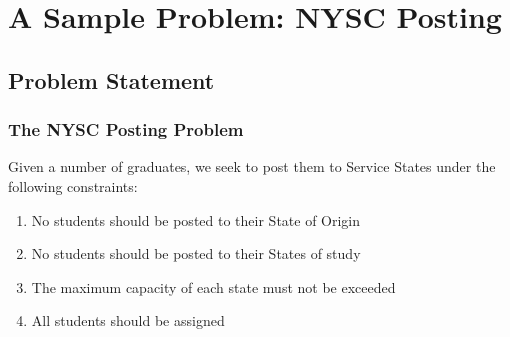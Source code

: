 \documentclass[10pt]{beamer}
\begin{document}
	\section{A Sample Problem: NYSC Posting}
		\subsection{Problem Statement}
			\begin{frame}
				\frametitle{The NYSC Posting Problem}
				Given a number of graduates, we seek to post them to Service States under the following constraints:
				\begin{enumerate}
					\item No students should be posted to their State of Origin
					\item No students should be posted to their States of study
					\item The maximum capacity of each state must not be exceeded%
					\item All students should be assigned
				\end{enumerate}
			\end{frame}
\end{document}
